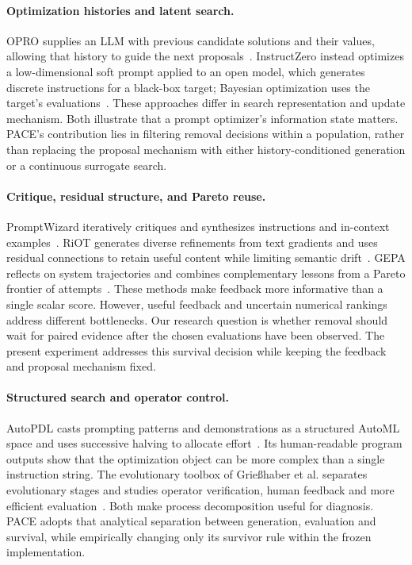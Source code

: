 \paragraph{Optimization histories and latent search.}
OPRO supplies an LLM with previous candidate solutions and their values, allowing
that history to guide the next proposals~\cite{opro}. InstructZero instead
optimizes a low-dimensional soft prompt applied to an open model, which generates
discrete instructions for a black-box target; Bayesian optimization uses the
target's evaluations~\cite{instructzero}. These approaches differ in search
representation and update mechanism. Both illustrate that a prompt optimizer's
information state matters. PACE's contribution lies in filtering removal decisions
within a population, rather than replacing the proposal mechanism with either
history-conditioned generation or a continuous surrogate search.

\paragraph{Critique, residual structure, and Pareto reuse.}
PromptWizard iteratively critiques and synthesizes instructions and in-context
examples~\cite{promptwizard}. RiOT generates diverse refinements from text
gradients and uses residual connections to retain useful content while limiting
semantic drift~\cite{riot}. GEPA reflects on system trajectories and combines
complementary lessons from a Pareto frontier of attempts~\cite{gepa}. These methods
make feedback more informative than a single scalar score. However, useful
feedback and uncertain numerical rankings address different bottlenecks. Our
research question is whether removal should wait for paired evidence after the
chosen evaluations have been observed. The present experiment addresses this survival decision while keeping the
feedback and proposal mechanism fixed.

\paragraph{Structured search and operator control.}
AutoPDL casts prompting patterns and demonstrations as a structured AutoML space
and uses successive halving to allocate effort~\cite{autopdl}. Its human-readable
program outputs show that the optimization object can be more complex than a
single instruction string. The evolutionary toolbox of Grie{\ss}haber et al.
separates evolutionary stages and studies operator verification, human feedback
and more efficient evaluation~\cite{toolbox}. Both make process decomposition
useful for diagnosis. PACE adopts that analytical separation between generation,
evaluation and survival, while empirically changing only its survivor rule
within the frozen implementation.

